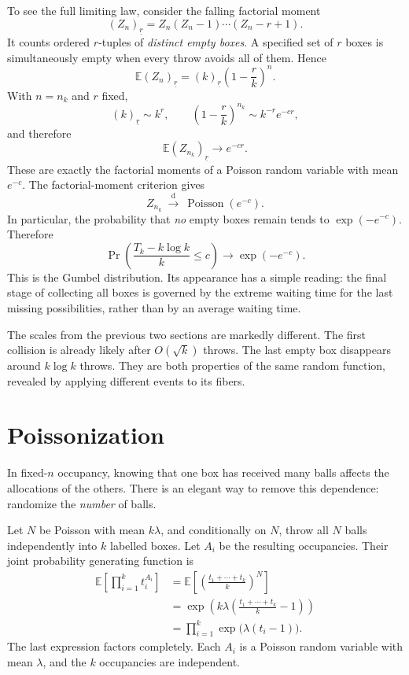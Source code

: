 To see the full limiting law, consider the falling factorial moment
\[
 (Z_n)_{\underline r}=Z_n(Z_n-1)\cdots(Z_n-r+1).
\]
It counts ordered \(r\)-tuples of \emph{distinct empty boxes}. A specified set of \(r\) boxes is simultaneously empty when every throw avoids all of them. Hence
\[
 \boxed{\mathbb E(Z_n)_{\underline r}
   =(k)_{\underline r}\left(1-\frac rk\right)^n.}
\]
With \(n=n_k\) and \(r\) fixed,
\[
 (k)_{\underline r}\sim k^r,\qquad
 \left(1-\frac rk\right)^{n_k}
 \sim k^{-r}e^{-cr},
\]
and therefore
\[
 \mathbb E(Z_{n_k})_{\underline r}\longrightarrow e^{-cr}.
\]
These are exactly the factorial moments of a Poisson random variable with mean \(e^{-c}\). The factorial-moment criterion gives
\[
 Z_{n_k}\ \xrightarrow{\mathrm d}\
 \operatorname{Poisson}(e^{-c}).
\]
In particular, the probability that \emph{no} empty boxes remain tends to \(\exp(-e^{-c})\). Therefore
\[
 \boxed{\Pr\left(
 \frac{T_k-k\log k}{k}\le c\right)
 \longrightarrow\exp(-e^{-c}).}
\]
This is the Gumbel distribution. Its appearance has a simple reading: the final stage of collecting all boxes is governed by the extreme waiting time for the last missing possibilities, rather than by an average waiting time.

The scales from the previous two sections are markedly different. The first collision is already likely after \(O(\sqrt{k})\) throws. The last empty box disappears around \(k\log k\) throws. They are both properties of the same random function, revealed by applying different events to its fibers.

\section{Poissonization}

In fixed-\(n\) occupancy, knowing that one box has received many balls affects the allocations of the others. There is an elegant way to remove this dependence: randomize the \emph{number} of balls.

Let \(N\) be Poisson with mean \(k\lambda\), and conditionally on \(N\), throw all \(N\) balls independently into \(k\) labelled boxes. Let \(A_i\) be the resulting occupancies. Their joint probability generating function is
\[
 \begin{aligned}
 \mathbb E\left[\prod_{i=1}^k t_i^{A_i}\right]
 &=\mathbb E\left[\left(\frac{t_1+\cdots+t_k}{k}\right)^N\right]\\
 &=\exp\left(k\lambda\left(\frac{t_1+\cdots+t_k}{k}-1\right)\right)\\
 &=\prod_{i=1}^k\exp\bigl(\lambda(t_i-1)\bigr).
 \end{aligned}
\]
The last expression factors completely. Each \(A_i\) is a Poisson random variable with mean \(\lambda\), and the \(k\) occupancies are independent.

